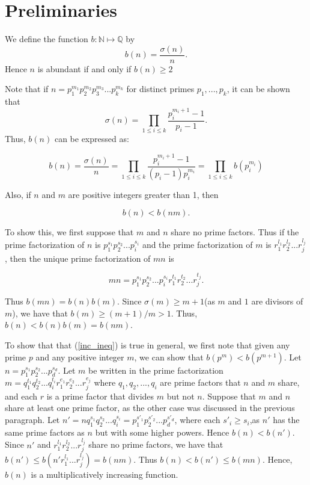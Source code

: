 \documentclass[../paper.tex]{article}
\begin{document}
\section{Preliminaries}

We define the function $b: \mathbb{N} \mapsto \mathbb{Q}$ by
%
$$b(n) = \frac{\sigma(n)}{n} .$$
%
Hence $n$ is abundant if and only if $b(n) \geq 2$

Note that if $n=p_1^{m_1}p_2^{m_2}p_3^{m_3}...p_{k}^{m_k}$ 
for distinct primes $p_1, ..., p_k$, it can be shown that 
%
$$\sigma(n) = \prod_{1 \leq i \leq k} \frac{p_i^{m_i + 1} -1}{p_i -1} .$$
%
Thus, $b(n)$ can be expressed as:


\begin{equation}\label{b_stuff}
  b(n) = \frac{\sigma(n)}{n} = \prod_{1 \leq i \leq k} 
  \frac{p_i^{m_i + 1} -1}{(p_i -1)p_{i}^{m_{i}}}
  =\prod_{1 \leq i \leq k} b(p_i^{m_i})
\end{equation}

Also, if $n$ and $m$ are positive integers greater than 1, then

\begin{equation}\label{inc_ineq}
  b(n) < b(nm). %
\end{equation}

To show this, we first suppose that $m$ and $n$ share no prime factors.
Thus if the prime factorization of $n$ is $p_1^{s_1} p_2^{s_2} ... p_i^{s_i}$ 
and the prime factorization of $m$ is $r_1^{l_1} r_2^{l_2} ... r_j^{l_j}$,
then the unique prime factorization of $mn$ is 

$$mn = p_1^{s_1} p_2^{s_2} ... p_i^{s_i} r_1^{t_1} r_2^{t_2} ... r_j^{t_j} .$$

Thus $b(mn) = b(n)b(m)$. Since $\sigma(m) \geq m + 1$(as $m$ and 
$1$ are divisors of $m$), we have that $b(m) \geq (m + 1) / m > 1$.
Thus,
$b(n) < b(n)b(m) = b(nm)$. 


To show that that (\ref{inc_ineq}) is true in general,
we first note that given any prime $p$ and
any positive integer $m$, we can show that $b(p^m) < b(p^{m + 1})$.
Let $n = p_1^{s_1} p_2^{s_2}... p_d^{s_d}$. 
Let $m$ be written in the prime factorization 
$m = q_1^{t_1} q_2^{t_2} ... q_i^{t_i} 
r_1^{e_1} r_2^{e_2} ... r_j^{e_j}$ where 
$q_1, q_2, ..., q_i$ are prime factors that $n$ and $m$ share,
and each $r$ is a prime factor that divides $m$ but not $n$.
Suppose that $m$ and $n$ share at least one prime factor, as the 
other case was discussed in the previous paragraph.
%
Let $n' = n q_1^{s_1} q_2^{s_2} ... q_i^{s_i} =
p_1^{s'_1} p_2^{s'_2} ... p_d^{s'_d}$, where each $s'_i \geq s_i$,as
$n'$ has the same prime factors as $n$ but with some higher powers.
Hence $b(n) < b(n')$. Since $n'$ and $r_1^{l_1} r_2^{l_2} ... r_j^{l_j}$
share no prime factors, we have that 
$b(n') \leq b(n' r_1^{l_1} ... r_j^{l_j}) = b(nm)$.
Thus $b(n) < b(n') \leq b(mn)$. Hence, $b(n)$ is a 
multiplicatively increasing function.
\\
\end{document}
